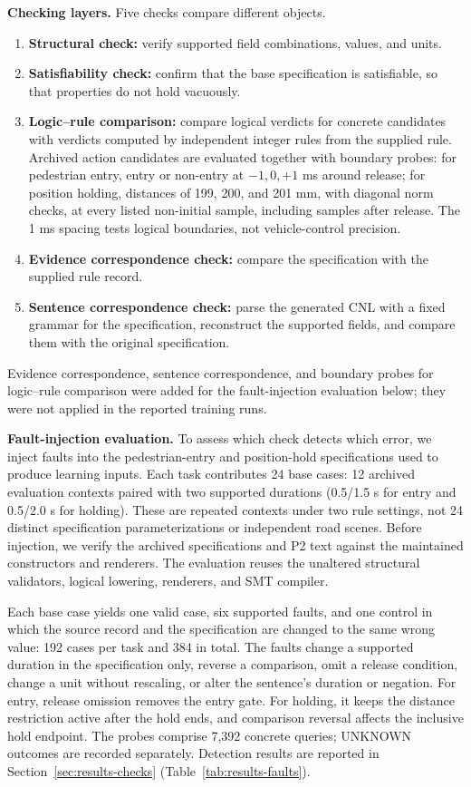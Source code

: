 \noindent\textbf{Checking layers.}
Five checks compare different objects.
\begin{enumerate}
\item \textbf{Structural check:} verify supported field combinations, values,
and units.
\item \textbf{Satisfiability check:} confirm that the base specification is
satisfiable, so that properties do not hold vacuously.
\item \textbf{Logic--rule comparison:} compare logical verdicts for concrete
candidates with verdicts computed by independent integer rules from the
supplied rule. Archived action candidates are evaluated together with boundary
probes: for pedestrian entry, entry or non-entry at $-1,0,+1$ ms around release;
for position holding, distances of 199, 200, and 201 mm, with diagonal norm
checks, at every listed non-initial sample, including samples after release.
The 1 ms spacing tests logical boundaries, not vehicle-control precision.
\item \textbf{Evidence correspondence check:} compare the specification with
the supplied rule record.
\item \textbf{Sentence correspondence check:} parse the generated CNL with a
fixed grammar for the specification, reconstruct the supported fields, and
compare them with the original specification.
\end{enumerate}
Evidence correspondence, sentence correspondence, and boundary probes for
logic--rule comparison were added for the fault-injection evaluation below;
they were not applied in the reported training runs.

\noindent\textbf{Fault-injection evaluation.}
To assess which check detects which error, we inject faults into the
pedestrian-entry and position-hold specifications used to produce learning
inputs. Each task contributes 24 base cases: 12 archived evaluation contexts
paired with two supported durations (0.5/1.5 s for entry and 0.5/2.0 s for
holding). These are repeated contexts under two rule settings, not 24 distinct
specification parameterizations or independent road scenes. Before injection,
we verify the archived specifications and P2 text against the maintained
constructors and renderers. The evaluation reuses the unaltered structural
validators, logical lowering, renderers, and SMT compiler.

Each base case yields one valid case, six supported faults, and one control in
which the source record and the specification are changed to the same wrong
value: 192 cases per task and 384 in total. The faults change a supported
duration in the specification only, reverse a comparison, omit a release
condition, change a unit without rescaling, or alter the sentence's duration
or negation. For entry, release omission removes the entry gate. For holding,
it keeps the distance restriction active after the hold ends, and comparison
reversal affects the inclusive hold endpoint. The probes comprise 7,392
concrete queries; UNKNOWN outcomes are recorded separately. Detection results
are reported in Section~\ref{sec:results-checks} (Table~\ref{tab:results-faults}).

